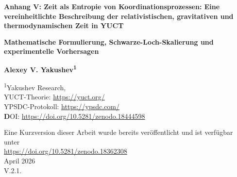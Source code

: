 \documentclass[12pt,a4paper]{article}
\newcommand{\Keff}{K_{\mathrm{eff}}}
\begin{document}
	
	\begin{titlepage}
		\begin{center}
			\vspace*{1cm}
			
			\Huge\textbf{Anhang V: Zeit als Entropie von Koordinationsprozessen: Eine vereinheitlichte Beschreibung der relativistischen, gravitativen und thermodynamischen Zeit in YUCT}
			
			\vspace{1cm}
			\Large\textbf{Mathematische Formulierung, Schwarze-Loch-Skalierung und experimentelle Vorhersagen}
			
			\vspace{1.5cm}
			
			\Large\textbf{Alexey V. Yakushev\textsuperscript{1}}
			
			\vspace{0.3cm}
			\large
			\textsuperscript{1}Yakushev Research, \\	YUCT-Theorie: \url{https://yuct.org/}\\
			YPSDC-Protokoll: \url{https://ypsdc.com/}\\
			
			\vspace{2cm}
			\textbf DOI: \url{https://doi.org/10.5281/zenodo.18444598}\\
			
			\vspace{1cm}
			
			\vspace{0cm}
			\large 
			Eine Kurzversion dieser Arbeit wurde bereits veröffentlicht und ist verfügbar unter\\ \url{https://doi.org/10.5281/zenodo.18362308}\\
			\vspace{1cm}
			April 2026 \\ \large V.2.1.
			
			\vspace{2cm}
			
			\begin{minipage}{0.9\textwidth}
				\begin{abstract}
					\noindent
					Dieser Anhang präsentiert eine neue Interpretation der Zeit innerhalb der Yakushev Unified Coordination Theory (YUCT). Zeit wird mit der Entropie von Koordinationsprozessen identifiziert, quantifiziert durch die Koordinationseffizienz \(\Keff\). Wir zeigen, dass der Lorentzfaktor \(\gamma\) in der speziellen Relativitätstheorie und die gravitative Zeitdilatation in der allgemeinen Relativitätstheorie natürlich als spezifische Formen von \(\Keff\) auftreten. Ein einheitlicher Ausdruck für die Eigenzeit \(d\tau = dt/\Keff(v,\Phi)\) wird hergeleitet, der in den geeigneten Grenzfällen auf die Standardformeln zurückführt. Für ein Photon (\(v=c\)) gilt \(\Keff \to \infty\) und die Eigenzeit verschwindet, was erklärt, warum Licht keine Zeit erfährt. Die Quantisierung der Koordinationsentropie führt zu einer fundamentalen Diskretisierung der Zeit auf der Planck-Skala und schlägt eine Brücke zur Quantengravitation.
					

\end{abstract}
\end{minipage}
\end{center}
\end{titlepage}
\end{document}
